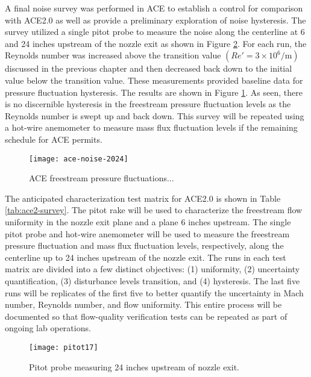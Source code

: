 A final noise survey was performed in ACE to establish a control for comparison with ACE2.0 as well as provide a preliminary exploration of noise hysteresis. The survey utilized a single pitot probe to measure the noise along the centerline at 6 and 24 inches upstream of the nozzle exit as shown in Figure \ref{fig:pitot17}. For each run, the Reynolds number was increased above the transition value $\left(Re' = 3 \times 10^6/\mathrm{m}\right)$ discussed in the previous chapter and then decreased back down to the initial value below the transition value. These measurements provided baseline data for pressure fluctuation hysteresis. The results are shown in Figure \ref{fig:ace-survey}. As seen, there is no discernible hysteresis in the freestream pressure fluctuation levels as the Reynolds number is swept up and back down. This survey will be repeated using a hot-wire anemometer to measure mass flux fluctuation levels if the remaining schedule for ACE permits.

\begin{figure}[ht!]
    \centering
    \texttt{[image: ace-noise-2024]}
    \caption{ACE freestream pressure fluctuations...}
    \label{fig:ace-survey}
\end{figure}

The anticipated characterization test matrix for ACE2.0 is shown in Table \ref{tab:ace2-survey}. The pitot rake will be used to characterize the freestream flow uniformity in the nozzle exit plane and a plane 6 inches upstream. The single pitot probe and hot-wire anemometer will be used to measure the freestream pressure fluctuation and mass flux fluctuation levels, respectively, along the centerline up to 24 inches upstream of the nozzle exit. The runs in each test matrix are divided into a few distinct objectives: (1) uniformity, (2) uncertainty quantification, (3) disturbance levels transition, and (4) hysteresis. The last five runs will be replicates of the first five to better quantify the uncertainty in Mach number, Reynolds number, and flow uniformity. This entire process will be documented so that flow-quality verification tests can be repeated as part of ongoing lab operations.

\begin{figure}[ht!]
    \centering
    \texttt{[image: pitot17]}
    \caption{Pitot probe measuring 24 inches upstream of nozzle exit.}
    \label{fig:pitot17}
\end{figure}

